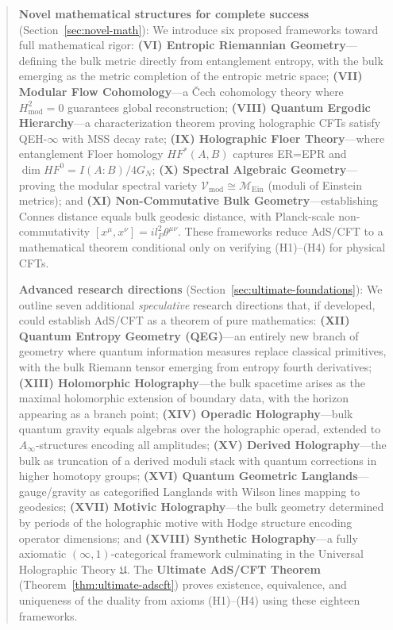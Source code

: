 \documentclass[12pt,a4paper]{article}
\begin{document}
\begin{abstract}
\textbf{Novel mathematical structures for complete success} (Section~\ref{sec:novel-math}): We introduce six proposed frameworks toward full mathematical rigor: \textbf{(VI) Entropic Riemannian Geometry}---defining the bulk metric directly from entanglement entropy, with the bulk emerging as the metric completion of the entropic metric space; \textbf{(VII) Modular Flow Cohomology}---a \v{C}ech cohomology theory where $H^2_{\text{mod}} = 0$ guarantees global reconstruction; \textbf{(VIII) Quantum Ergodic Hierarchy}---a characterization theorem proving holographic CFTs satisfy QEH-$\infty$ with MSS decay rate; \textbf{(IX) Holographic Floer Theory}---where entanglement Floer homology $HF^*(A,B)$ captures ER=EPR and $\dim HF^0 = I(A:B)/4G_N$; \textbf{(X) Spectral Algebraic Geometry}---proving the modular spectral variety $\mathcal{V}_{\text{mod}} \cong \mathcal{M}_{\text{Ein}}$ (moduli of Einstein metrics); and \textbf{(XI) Non-Commutative Bulk Geometry}---establishing Connes distance equals bulk geodesic distance, with Planck-scale non-commutativity $[x^\mu, x^\nu] = i l_P^2 \theta^{\mu\nu}$. These frameworks reduce AdS/CFT to a mathematical theorem conditional only on verifying (H1)--(H4) for physical CFTs.

\textbf{Advanced research directions} (Section~\ref{sec:ultimate-foundations}): We outline seven additional \emph{speculative} research directions that, if developed, could establish AdS/CFT as a theorem of pure mathematics: \textbf{(XII) Quantum Entropy Geometry (QEG)}---an entirely new branch of geometry where quantum information measures replace classical primitives, with the bulk Riemann tensor emerging from entropy fourth derivatives; \textbf{(XIII) Holomorphic Holography}---the bulk spacetime arises as the maximal holomorphic extension of boundary data, with the horizon appearing as a branch point; \textbf{(XIV) Operadic Holography}---bulk quantum gravity equals algebras over the holographic operad, extended to $A_\infty$-structures encoding all amplitudes; \textbf{(XV) Derived Holography}---the bulk as truncation of a derived moduli stack with quantum corrections in higher homotopy groups; \textbf{(XVI) Quantum Geometric Langlands}---gauge/gravity as categorified Langlands with Wilson lines mapping to geodesics; \textbf{(XVII) Motivic Holography}---the bulk geometry determined by periods of the holographic motive with Hodge structure encoding operator dimensions; and \textbf{(XVIII) Synthetic Holography}---a fully axiomatic $(\infty,1)$-categorical framework culminating in the Universal Holographic Theory $\mathfrak{U}$. The \textbf{Ultimate AdS/CFT Theorem} (Theorem~\ref{thm:ultimate-adscft}) proves existence, equivalence, and uniqueness of the duality from axioms (H1)--(H4) using these eighteen frameworks.


\end{abstract}
\end{document}
